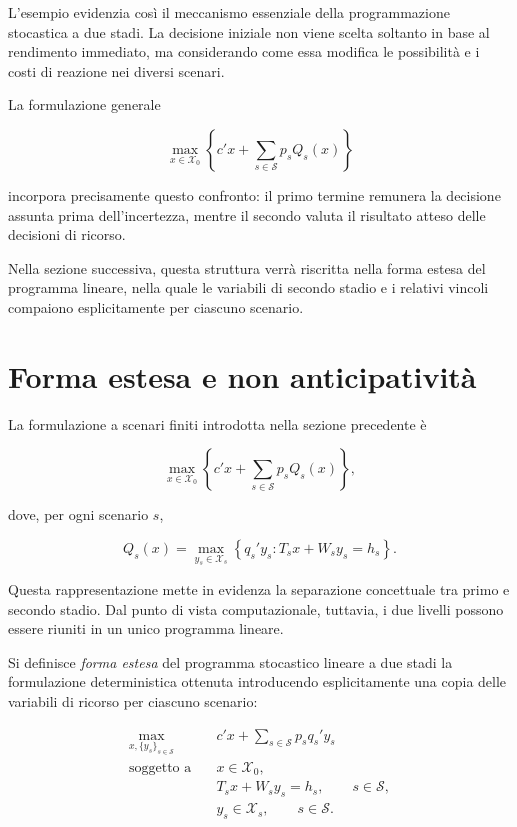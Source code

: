 L'esempio evidenzia cos\`i il meccanismo essenziale della programmazione
stocastica a due stadi. La decisione iniziale non viene scelta soltanto in
base al rendimento immediato, ma considerando come essa modifica le
possibilit\`a e i costi di reazione nei diversi scenari.

La formulazione generale

\[
\max_{x\in\mathcal X_0}
\left\{
c'x+\sum_{s\in\mathcal S}p_sQ_s(x)
\right\}
\]

\noindent incorpora precisamente questo confronto: il primo termine remunera la
decisione assunta prima dell'incertezza, mentre il secondo valuta il
risultato atteso delle decisioni di ricorso.

Nella sezione successiva, questa struttura verr\`a riscritta nella forma
estesa del programma lineare, nella quale le variabili di secondo stadio
e i relativi vincoli compaiono esplicitamente per ciascuno scenario.

\section{Forma estesa e non anticipativit\`a}

\label{sec:cap14-forma-estesa}

La formulazione a scenari finiti introdotta nella sezione precedente \`e

\[
\max_{x\in\mathcal X_0}
\left\{
c'x+\sum_{s\in\mathcal S}p_sQ_s(x)
\right\},
\]

\noindent dove, per ogni scenario $s$,

\[
Q_s(x)
=
\max_{y_s\in\mathcal X_s}
\left\{
q_s'y_s:
T_sx+W_sy_s=h_s
\right\}.
\]

Questa rappresentazione mette in evidenza la separazione concettuale tra
primo e secondo stadio. Dal punto di vista computazionale, tuttavia, i due
livelli possono essere riuniti in un unico programma lineare.

\begin{definition}
Si definisce \emph{forma estesa} del programma stocastico lineare a due
stadi la formulazione deterministica ottenuta introducendo esplicitamente
una copia delle variabili di ricorso per ciascuno scenario:

\begin{equation}
\begin{aligned}
\max_{x,\{y_s\}_{s\in\mathcal S}}
\quad&
c'x+\sum_{s\in\mathcal S}p_s q_s'y_s
\\
\text{soggetto a}\quad&
x\in\mathcal X_0,
\\
&
T_sx+W_sy_s=h_s,
\qquad s\in\mathcal S,
\\
&
y_s\in\mathcal X_s,
\qquad s\in\mathcal S.
\end{aligned}
\label{eq:cap14-forma-estesa}
\end{equation}
\end{definition}


